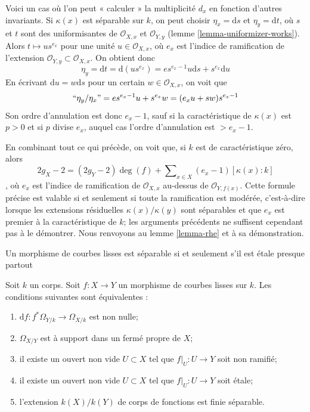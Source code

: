 \medskip\noindent
Voici un cas où l'on peut « calculer » la multiplicité $d_x$ en fonction d'autres invariants. Si $\kappa(x)$ est séparable sur $k$, on peut choisir $\eta_x = \text{d}s$ et $\eta_y = \text{d}t$, où $s$ et $t$ sont des uniformisantes de $\mathcal{O}_{X, x}$ et $\mathcal{O}_{Y, y}$ (lemme \ref{lemma-uniformizer-works}). Alors $t \mapsto u s^{e_x}$ pour une unité $u \in \mathcal{O}_{X, x}$, où $e_x$ est l'indice de ramification de l'extension $\mathcal{O}_{Y, y} \subset \mathcal{O}_{X, x}$. On obtient donc $$
\eta_y = \text{d}t = \text{d}(u s^{e_x}) =
e s^{e_x - 1} u \text{d}s + s^{e_x} \text{d}u
$$ En écrivant $\text{d}u = w \text{d}s$ pour un certain $w \in \mathcal{O}_{X, x}$, on voit que $$
``\eta_y/\eta_x" = e s^{e_x - 1} u + s^{e_x} w = (e_x u + s w)s^{e_x - 1}
$$ Son ordre d'annulation est donc $e_x - 1$, sauf si la caractéristique de $\kappa(x)$ est $p > 0$ et si $p$ divise $e_x$, auquel cas l'ordre d'annulation est $> e_x - 1$.

\medskip\noindent
En combinant tout ce qui précède, on voit que, si $k$ est de caractéristique zéro, alors $$
2g_X - 2 = (2g_Y - 2)\deg(f) +
\sum\nolimits_{x \in X} (e_x - 1)[\kappa(x) : k]
$$, où $e_x$ est l'indice de ramification de $\mathcal{O}_{X, x}$ au-dessus de $\mathcal{O}_{Y, f(x)}$. Cette formule précise est valable si et seulement si toute la ramification est modérée, c'est-à-dire lorsque les extensions résiduelles $\kappa(x)/\kappa(y)$ sont séparables et que $e_x$ est premier à la caractéristique de $k$; les arguments précédents ne suffisent cependant pas à le démontrer. Nous renvoyons au lemme \ref{lemma-rhe} et à sa démonstration.

\begin{lemma}
\label{lemma-generically-etale}
\begin{slogan}
Un morphisme de courbes lisses est séparable si et seulement s'il est étale presque partout
\end{slogan}
Soit $k$ un corps. Soit $f : X \to Y$ un morphisme de courbes lisses sur $k$. Les conditions suivantes sont équivalentes : \begin{enumerate} \item $\text{d}f : f^*\Omega_{Y/k} \to \Omega_{X/k}$ est non nulle; \item $\Omega_{X/Y}$ est à support dans un fermé propre de $X$; \item il existe un ouvert non vide $U \subset X$ tel que $f|_U : U \to Y$ soit non ramifié; \item il existe un ouvert non vide $U \subset X$ tel que $f|_U : U \to Y$ soit \'etale; \item l'extension $k(X)/k(Y)$ de corps de fonctions est finie séparable.
\end{enumerate}
\end{lemma}

